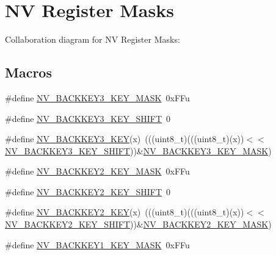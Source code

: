 \hypertarget{group___n_v___register___masks}{}\section{NV Register Masks}
\label{group___n_v___register___masks}
Collaboration diagram for NV Register Masks\+:
\subsection*{Macros}
\begin{DoxyCompactItemize}
\item 
\#define \hyperlink{group___n_v___register___masks_gabe9123bc8137627b30e4f75c757cfb95}{N\+V\+\_\+\+B\+A\+C\+K\+K\+E\+Y3\+\_\+\+K\+E\+Y\+\_\+\+M\+A\+SK}~0x\+F\+Fu
\item 
\#define \hyperlink{group___n_v___register___masks_ga78b75e37d984596ddd9053d2125a78ff}{N\+V\+\_\+\+B\+A\+C\+K\+K\+E\+Y3\+\_\+\+K\+E\+Y\+\_\+\+S\+H\+I\+FT}~0
\item 
\#define \hyperlink{group___n_v___register___masks_ga2fa5913563629cd7c8b509cc87421687}{N\+V\+\_\+\+B\+A\+C\+K\+K\+E\+Y3\+\_\+\+K\+EY}(x)~(((uint8\+\_\+t)(((uint8\+\_\+t)(x))$<$$<$\hyperlink{group___n_v___register___masks_ga78b75e37d984596ddd9053d2125a78ff}{N\+V\+\_\+\+B\+A\+C\+K\+K\+E\+Y3\+\_\+\+K\+E\+Y\+\_\+\+S\+H\+I\+FT}))\&\hyperlink{group___n_v___register___masks_gabe9123bc8137627b30e4f75c757cfb95}{N\+V\+\_\+\+B\+A\+C\+K\+K\+E\+Y3\+\_\+\+K\+E\+Y\+\_\+\+M\+A\+SK})
\item 
\#define \hyperlink{group___n_v___register___masks_ga5bf8822b0b59a321d9b5c30eb1618704}{N\+V\+\_\+\+B\+A\+C\+K\+K\+E\+Y2\+\_\+\+K\+E\+Y\+\_\+\+M\+A\+SK}~0x\+F\+Fu
\item 
\#define \hyperlink{group___n_v___register___masks_ga408b1083508e784cba76d5be9b147a84}{N\+V\+\_\+\+B\+A\+C\+K\+K\+E\+Y2\+\_\+\+K\+E\+Y\+\_\+\+S\+H\+I\+FT}~0
\item 
\#define \hyperlink{group___n_v___register___masks_gaca7b47cbaa596b76f92f926f40dcc80a}{N\+V\+\_\+\+B\+A\+C\+K\+K\+E\+Y2\+\_\+\+K\+EY}(x)~(((uint8\+\_\+t)(((uint8\+\_\+t)(x))$<$$<$\hyperlink{group___n_v___register___masks_ga408b1083508e784cba76d5be9b147a84}{N\+V\+\_\+\+B\+A\+C\+K\+K\+E\+Y2\+\_\+\+K\+E\+Y\+\_\+\+S\+H\+I\+FT}))\&\hyperlink{group___n_v___register___masks_ga5bf8822b0b59a321d9b5c30eb1618704}{N\+V\+\_\+\+B\+A\+C\+K\+K\+E\+Y2\+\_\+\+K\+E\+Y\+\_\+\+M\+A\+SK})
\item 
\#define \hyperlink{group___n_v___register___masks_ga6cd05d78b113df7f3cb0d11d29931666}{N\+V\+\_\+\+B\+A\+C\+K\+K\+E\+Y1\+\_\+\+K\+E\+Y\+\_\+\+M\+A\+SK}~0x\+F\+Fu

\end{DoxyCompactItemize}

